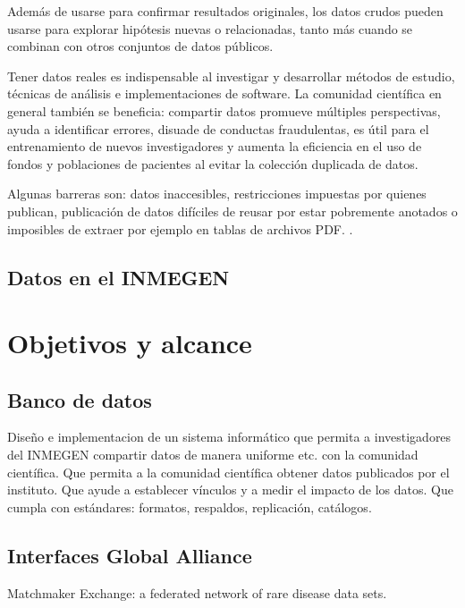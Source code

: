 \documentclass[
10pt, %
letterpaper, %
oneside, %
headinclude,footinclude, %
BCOR5mm, %
]{scrartcl}
\begin{document}
Además de usarse para confirmar resultados originales, los datos
crudos pueden usarse para explorar hipótesis nuevas o relacionadas,
tanto más cuando se combinan con otros conjuntos de datos públicos.

Tener datos reales es indispensable al investigar y desarrollar
métodos de estudio, técnicas de análisis e implementaciones de
software. La comunidad científica en general también se beneficia:
compartir datos promueve múltiples perspectivas, ayuda a identificar
errores, disuade de conductas fraudulentas, es útil para el
entrenamiento de nuevos investigadores y aumenta la eficiencia en el
uso de fondos y poblaciones de pacientes al evitar la colección
duplicada de datos.\cite{piwowar_sharing_2007}


Algunas barreras son: datos inaccesibles, restricciones impuestas por
quienes publican, publicación de datos difíciles de reusar por estar
pobremente anotados o imposibles de extraer por ejemplo en tablas de
archivos PDF. \cite{molloy_open_2011}.

\cite{wicherts_publish_2012}


\subsection{Datos en el INMEGEN}



\section{Objetivos y alcance}


\subsection{Banco de datos}

Diseño e implementacion de un sistema informático que permita a
investigadores del INMEGEN compartir datos de manera uniforme etc. con
la comunidad científica. Que permita a la comunidad científica obtener
datos publicados por el instituto. Que ayude a establecer vínculos y a
medir el impacto de los datos. Que cumpla con estándares: formatos,
respaldos, replicación, catálogos.
\cite{_data_????}
\cite{altman_proposed_2007}


\subsection{Interfaces Global Alliance}

Matchmaker Exchange: a federated network of rare disease data sets.
\end{document}
